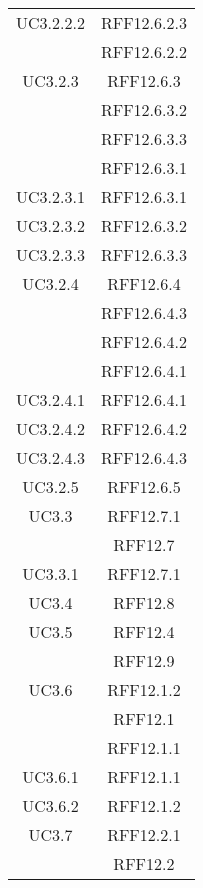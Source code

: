 \begin{longtable}{|c|c|}
\midrule
UC3.2.2.2
& RFF12.6.2.3\\
& RFF12.6.2.2\\

\midrule
UC3.2.3
& RFF12.6.3\\
& RFF12.6.3.2\\
& RFF12.6.3.3\\
& RFF12.6.3.1\\

\midrule
UC3.2.3.1
& RFF12.6.3.1\\

\midrule
UC3.2.3.2
& RFF12.6.3.2\\

\midrule
UC3.2.3.3
& RFF12.6.3.3\\

\midrule
UC3.2.4
& RFF12.6.4\\
& RFF12.6.4.3\\
& RFF12.6.4.2\\
& RFF12.6.4.1\\

\midrule
UC3.2.4.1
& RFF12.6.4.1\\

\midrule
UC3.2.4.2
& RFF12.6.4.2\\

\midrule
UC3.2.4.3
& RFF12.6.4.3\\

\midrule
UC3.2.5
& RFF12.6.5\\

\midrule
UC3.3
& RFF12.7.1\\
& RFF12.7\\

\midrule
UC3.3.1
& RFF12.7.1\\

\midrule
UC3.4
& RFF12.8\\

\midrule
UC3.5
& RFF12.4\\
& RFF12.9\\

\midrule
UC3.6
& RFF12.1.2\\
& RFF12.1\\
& RFF12.1.1\\

\midrule
UC3.6.1
& RFF12.1.1\\

\midrule
UC3.6.2
& RFF12.1.2\\

\midrule
UC3.7
& RFF12.2.1\\
& RFF12.2\\


\end{longtable}

